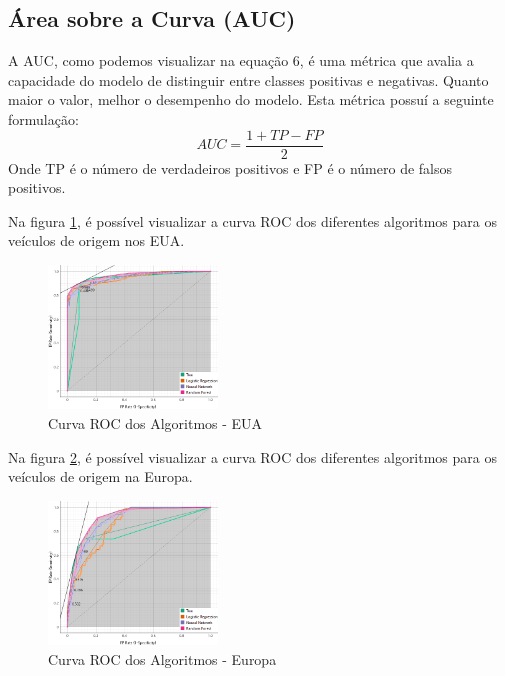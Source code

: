 \documentclass[conference]{IEEEtran}
\begin{document}
\subsection{Área sobre a Curva (AUC)}
A AUC, como podemos visualizar na equação 6, é uma métrica que avalia a capacidade do modelo de distinguir entre classes positivas e negativas. Quanto maior o valor, melhor o desempenho do modelo.
Esta métrica possuí a seguinte formulação:
\begin{equation}
	AUC = \frac{1 + TP - FP}{2}
\end{equation}
Onde TP é o número de verdadeiros positivos e FP é o número de falsos positivos.

Na figura \ref{fig:roc_eua}, é possível visualizar a curva ROC dos diferentes algoritmos para os veículos de origem nos EUA.
\begin{figure}[!ht]
	\centering
	\includegraphics[width=0.4\textwidth]{Resources/ROC_EUA.png}
	\caption{Curva ROC dos Algoritmos - EUA}
	\label{fig:roc_eua}
\end{figure}

Na figura \ref{fig:roc_eu}, é possível visualizar a curva ROC dos diferentes algoritmos para os veículos de origem na Europa.
\begin{figure}[!ht]
	\centering
	\includegraphics[width=0.4\textwidth]{Resources/ROC_EU.png}
	\caption{Curva ROC dos Algoritmos - Europa}
	\label{fig:roc_eu}
\end{figure}
\end{document}

